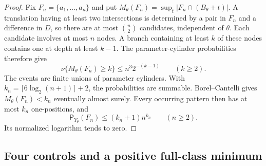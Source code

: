 \documentclass[11pt,reqno]{amsart}
\numberwithin{equation}{section}
\theoremstyle{definition}
\theoremstyle{definition}
\newcommand{\Patt}{\mathsf P}
\begin{document}
\begin{proof}
Fix $F_n=\{a_1,\ldots,a_n\}$ and put
$M_\theta(F_n)=\sup_t|F_n\cap(B_\theta+t)|$.
A translation having at least two intersections is determined
by a pair in $F_n$ and a difference in $D$, so there are at most
$\binom n2$ candidates, independent of $\theta$. Each candidate
involves at most $n$ nodes. A branch containing at least $k$
of these nodes contains one at depth at least $k-1$. The
parameter-cylinder probabilities therefore give
\[
 \nu\{M_\theta(F_n)\ge k\}\le n^3 2^{-(k-1)}
 \qquad(k\ge2).
\]
The events are finite unions of parameter cylinders. With
$k_n=\lceil6\log_2(n+1)\rceil+2$, the probabilities are summable.
Borel--Cantelli gives $M_\theta(F_n)<k_n$ eventually almost surely.
Every occurring pattern then has at most $k_n$ one-positions, and
\[
 \Patt_{Y_\theta}(F_n)\le(k_n+1)n^{k_n}\qquad(n\ge2).
\]
Its normalized logarithm tends to zero.
\end{proof}

\subsection{Four controls and a positive full-class minimum}
\end{document}
